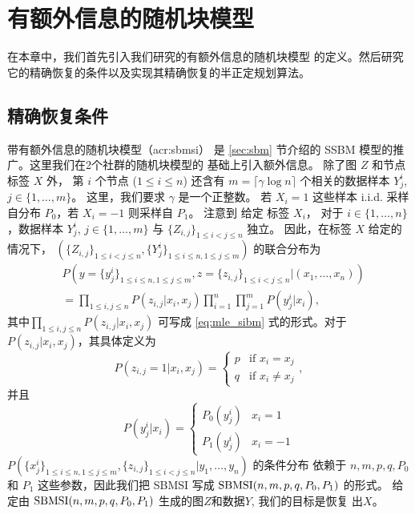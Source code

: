 \chapter{有额外信息的随机块模型}
\label{chap:sbmsi}
在本章中，我们首先引入我们研究的有额外信息的随机块模型
的定义。然后研究它的精确恢复的条件以及实现其精确恢复的半正定规划算法。

\section{精确恢复条件}
\label{sec:sbmsi_exact_recovery_condtion}
带有额外信息的随机块模型（\gls{acr:sbmsi}）
是 \ref{sec:sbm} 节介绍的
SSBM 模型的推广。这里我们在2个社群的随机块模型的
基础上引入额外信息。
除了图 $Z$ 和节点标签 $X$ 外，
第 $i$  个节点 ($1\leq i \leq n$) 
还含有 $m=\lceil \gamma \log n \rceil $ 个相关的数据样本 
$Y^{i}_{j}$, $j\in \{1,\ldots,m\}$。
这里，我们要求 $\gamma$ 是一个正整数。
若 $X_i=1$
这些样本 i.i.d. 采样自分布 $P_0$，若  $X_i=-1$ 则采样自 $P_1$。
注意到 给定 标签 $X_i$，
对于 $i\in\{1,\ldots,n\}$，数据样本 $Y^{i}_{j}$, $j\in \{1,\ldots,m\}$ 与 $\{Z_{i,j}\}_{1\le i<j\le n}$ 独立。
 因此，在标签 $X$ 给定的情况下，
  $(\{Z_{i,j}\}_{1\le i<j\le n},\{Y^i_{j}\}_{1\le i\le n,1\le j\le m})$ 的联合分布为  
\begin{align}\label{eq:lh}
    &P(y=\{y^i_{j}\}_{1\le i\le n,1\le j\le m},z=\{z_{i,j}\}_{1\le i<j\le n}| (x_1,\ldots,x_n)) \nonumber\\
    &= \prod_{1\le i,j\le n}P(z_{i,j}|x_i,x_j)\prod_{i=1}^n \prod_{j=1}^m P(y^i_j|x_i), 
\end{align}
其中$\prod_{1\le i,j\le n}P(z_{i,j}|x_i,x_j)$ 可写成
\eqref{eq:mle_sibm} 式的形式。对于$P(z_{i,j}|x_i,x_j)$，其具体定义为
\begin{equation*}
    P  (z_{i,j}=1|x_i,x_j) = \begin{cases}
        p & \text{if } x_i = x_j \\
        q & \text{if } x_i\ne x_j
    \end{cases},
\end{equation*}
并且
\begin{equation*}
    P(y^i_j|x_i) = \begin{cases}
        P_0(y^i_j) & x_i = 1 \\
        P_1(y^i_j) & x_i = -1
    \end{cases}
\end{equation*}
 $P(\{x^i_{j}\}_{1\le i\le n,1\le j\le m},\{z_{i,j}\}_{1\le i<j\le n}| y_1,\ldots,y_n)$ 
 的条件分布 依赖于
 $n,m,p, q, P_0$ 和 $P_1$ 这些参数，因此我们把 SBMSI 写成 $\operatorname{SBMSI}(n,m,p,q,P_0,P_1)$ 的形式。
 给定由 $\operatorname{SBMSI}(n,m,p,q,P_0,P_1)$ 生成的图$Z$和数据$Y$, 我们的目标是恢复 出$X$。
 
